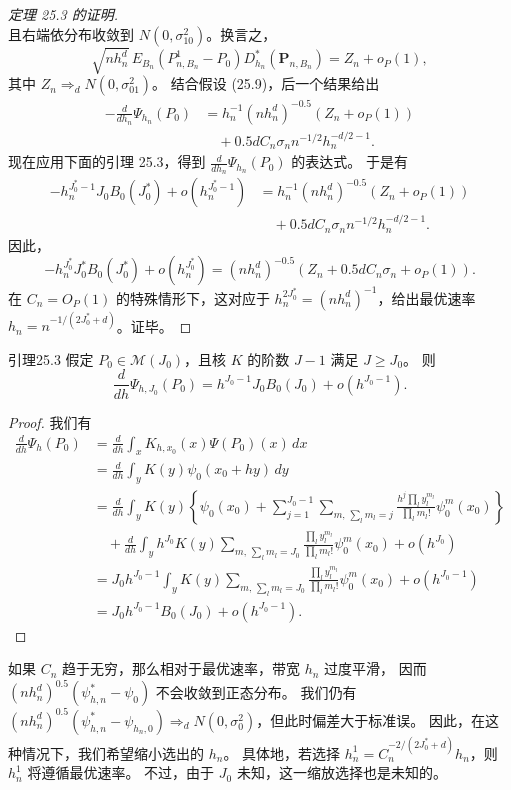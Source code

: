 \begin{proof}[定理 25.3 的证明]
\[\]
且右端依分布收敛到 $N(0,\sigma_{10}^2)$。换言之，
\[
 \sqrt{nh_n^d}\,E_{B_n}(P^1_{n,B_n}-P_0)
 D_{h_n}^*(\mathbf P_{n,B_n})=Z_n+o_P(1),
\]
其中 $Z_n\Rightarrow_dN(0,\sigma_{01}^2)$。
结合假设 (25.9)，后一个结果给出
\[
\begin{aligned}
 -\frac{d}{dh_n}\Psi_{h_n}(P_0)
 &=h_n^{-1}(nh_n^d)^{-0.5}(Z_n+o_P(1))\\
 &\quad+0.5dC_n\sigma_nn^{-1/2}h_n^{-d/2-1}.
\end{aligned}
\]
现在应用下面的引理 25.3，得到 $\frac{d}{dh_n}\Psi_{h_n}(P_0)$ 的表达式。
于是有
\[
\begin{aligned}
 -h_n^{J_0^*-1}J_0B_0(J_0^*)+o(h_n^{J_0^*-1})
 &=h_n^{-1}(nh_n^d)^{-0.5}(Z_n+o_P(1))\\
 &\quad+0.5dC_n\sigma_nn^{-1/2}h_n^{-d/2-1}.
\end{aligned}
\]
因此，
\[
 -h_n^{J_0^*}J_0^*B_0(J_0^*)+o(h_n^{J_0^*})
 =(nh_n^d)^{-0.5}(Z_n+0.5dC_n\sigma_n+o_P(1)).
\]
在 $C_n=O_P(1)$ 的特殊情形下，这对应于
$h_n^{2J_0^*}=(nh_n^d)^{-1}$，给出最优速率
$h_n=n^{-1/(2J_0^*+d)}$。证毕。
\end{proof}

\begin{bookresult}{引理}{25.3}
假定 $P_0\in\mathcal M(J_0)$，且核 $K$ 的阶数 $J-1$ 满足 $J\geq J_0$。
则
\[
 \frac{d}{dh}\Psi_{h,J_0}(P_0)
 =h^{J_0-1}J_0B_0(J_0)+o(h^{J_0-1}).
\]
\end{bookresult}

\begin{proof}
我们有
\[
\begin{aligned}
 \frac{d}{dh}\Psi_h(P_0)
 &=\frac{d}{dh}\int_xK_{h,x_0}(x)\Psi(P_0)(x)\,dx\\
 &=\frac{d}{dh}\int_yK(y)\psi_0(x_0+hy)\,dy\\
 &=\frac{d}{dh}\int_yK(y)
 \left\{\psi_0(x_0)+\sum_{j=1}^{J_0-1}
 \sum_{m,\,\sum_lm_l=j}
 \frac{h^j\prod_ly_l^{m_l}}{\prod_lm_l!}\psi_0^m(x_0)\right\}\\
 &\quad+\frac{d}{dh}\int_yh^{J_0}K(y)
 \sum_{m,\,\sum_lm_l=J_0}
 \frac{\prod_ly_l^{m_l}}{\prod_lm_l!}\psi_0^m(x_0)+o(h^{J_0})\\
 &=J_0h^{J_0-1}\int_yK(y)
 \sum_{m,\,\sum_lm_l=J_0}
 \frac{\prod_ly_l^{m_l}}{\prod_lm_l!}\psi_0^m(x_0)+o(h^{J_0-1})\\
 &=J_0h^{J_0-1}B_0(J_0)+o(h^{J_0-1}).
\end{aligned}
\]
\end{proof}

\begin{remarkenv}
如果 $C_n$ 趋于无穷，那么相对于最优速率，带宽 $h_n$ 过度平滑，
因而 $(nh_n^d)^{0.5}(\psi^*_{h,n}-\psi_0)$ 不会收敛到正态分布。
我们仍有
$(nh_n^d)^{0.5}(\psi^*_{h,n}-\psi_{h_n,0})
\Rightarrow_dN(0,\sigma_0^2)$，但此时偏差大于标准误。
因此，在这种情况下，我们希望缩小选出的 $h_n$。
具体地，若选择
$h_n^1=C_n^{-2/(2J_0^*+d)}h_n$，则 $h_n^1$ 将遵循最优速率。
不过，由于 $J_0$ 未知，这一缩放选择也是未知的。
\end{remarkenv}
